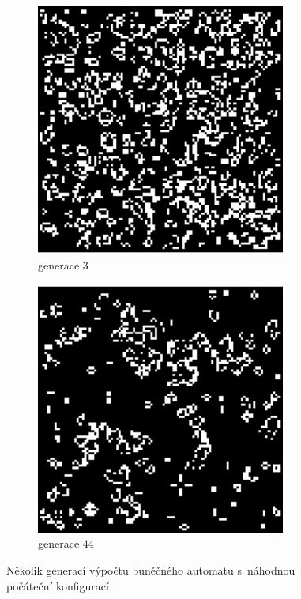 \begin{figure}
 \begin{subfigure}{0.4\textwidth}
  \includegraphics[width=0.9\textwidth]{genimg-game-of-life-3}
  \caption{generace $3$}
 \end{subfigure}%
 \begin{subfigure}{0.4\textwidth}
  \includegraphics[width=0.9\textwidth]{genimg-game-of-life-4}
  \caption{generace $44$}
 \end{subfigure}
 
 \caption[Ukázka generací výpočtu buněčného automatu]{Několik generací výpočtu buněčného automatu  s~náhodnou počáteční konfigurací} \label{img:GameOfLife}
\end{figure}


